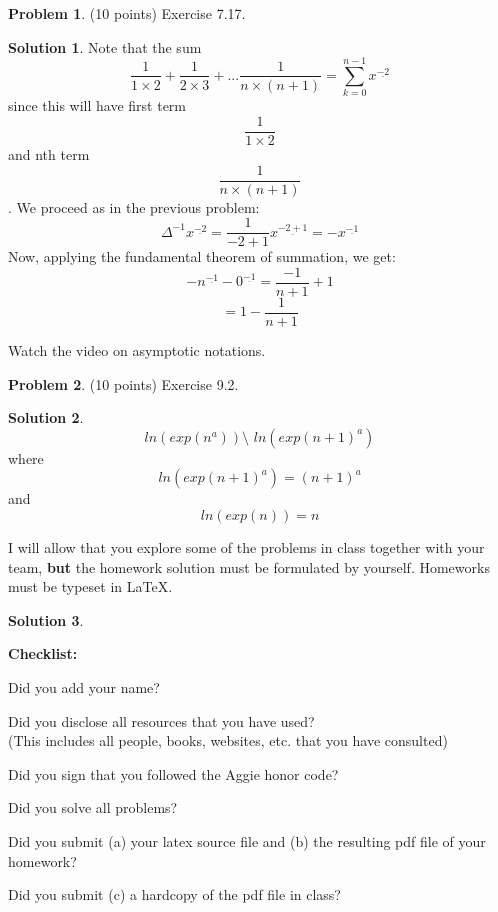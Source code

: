 \documentclass{article}
\theoremstyle{definition}
\newtheorem{problem}{Problem}
\newtheorem*{solution}{Solution}
\newcommand{\checklist}{\noindent\textbf{Checklist:}
\begin{compactitem}[$\Box$] 
\item Did you add your name? 
\item Did you disclose all resources that you have used? \\
(This includes all people, books, websites, etc. that you have consulted)
\item Did you sign that you followed the Aggie honor code? 
\item Did you solve all problems? 
\item Did you submit (a) your latex source file and (b) the resulting pdf file
  of your homework?
\item Did you submit (c) a hardcopy of the pdf file in class? 
\end{compactitem}
}
\begin{document}
\begin{problem} (10 points)
Exercise 7.17.
\end{problem}
\begin{solution}
Note that the sum \[\frac{1}{{1\times{2}}} + \frac{1}{2\times{3}} + . . .\frac{1}{n\times{(n+1)}}= \sum\limits_{k=0}^{n-1} x^{\underline{-2}}\] since this will have first term \[\frac{1}{1\times{2}}\] and nth term \[\frac{1}{n\times{(n+1)}}\].
We proceed as in the previous problem:
\[\Delta^{-1} x^{\underline{-2}} = \frac{1}{-2+1} x^{\underline{-2+1}} = -x^{\underline{-1}}  \]
Now, applying the fundamental theorem of summation, we get:
\[-n^{\underline{-1}} - 0^{\underline{-1}} = \frac{-1}{n+1} + 1\]
\[= 1 - \frac{1}{n+1}\]
\end{solution}

Watch the video on asymptotic notations. 
\begin{problem} (10 points)
Exercise 9.2.
\end{problem}
\begin{solution}
\[ln(exp(n^{a})) \texttt{\char`\~}  ln(exp(n+1)^{a})\] where \[ln(exp(n+1)^{a}) = (n+1)^{a}\] and \[ln(exp(n)) = n\]
\[\]
\end{solution}




I will allow that you explore some of the problems in class together with
your team, \textbf{but} the homework solution must be formulated by
yourself. Homeworks must be typeset in \LaTeX{}. 
\begin{solution}
\end{solution}








\goodbreak
\checklist
\end{document}
